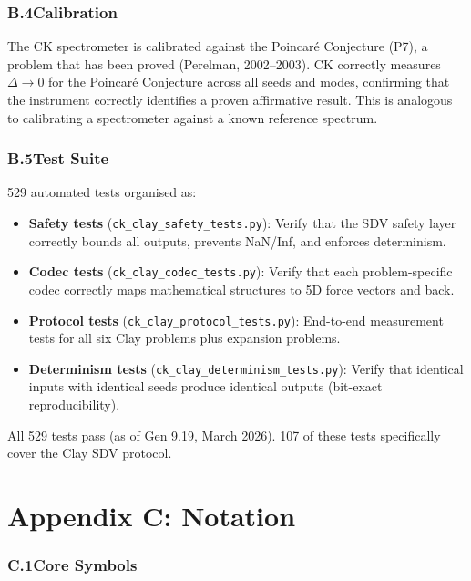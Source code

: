 \documentclass[12pt, openany]{book}
\theoremstyle{remark}
\begin{document}
\subsection*{B.4\quad Calibration}

The CK spectrometer is calibrated against the Poincar\'{e} Conjecture (P7),
a problem that has been proved (Perelman, 2002--2003). CK correctly measures
$\Delta \to 0$ for the Poincar\'{e} Conjecture across all seeds and modes,
confirming that the instrument correctly identifies a proven affirmative result.
This is analogous to calibrating a spectrometer against a known reference spectrum.

\subsection*{B.5\quad Test Suite}

529 automated tests organised as:
\begin{itemize}
  \item \textbf{Safety tests} (\texttt{ck\_clay\_safety\_tests.py}): Verify that
        the SDV safety layer correctly bounds all outputs, prevents NaN/Inf,
        and enforces determinism.
  \item \textbf{Codec tests} (\texttt{ck\_clay\_codec\_tests.py}): Verify that
        each problem-specific codec correctly maps mathematical structures to
        5D force vectors and back.
  \item \textbf{Protocol tests} (\texttt{ck\_clay\_protocol\_tests.py}): End-to-end
        measurement tests for all six Clay problems plus expansion problems.
  \item \textbf{Determinism tests} (\texttt{ck\_clay\_determinism\_tests.py}):
        Verify that identical inputs with identical seeds produce identical outputs
        (bit-exact reproducibility).
\end{itemize}

\noindent
All 529 tests pass (as of Gen 9.19, March 2026). 107 of these tests specifically
cover the Clay SDV protocol.


\chapter*{Appendix C: Notation}
\label{app:notation}

\subsection*{C.1\quad Core Symbols}
\end{document}

